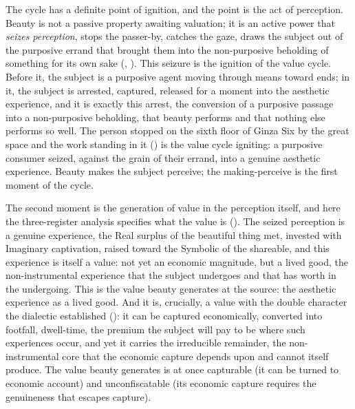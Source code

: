 The cycle has a definite point of ignition, and the point is the act of perception. Beauty is not a passive property awaiting valuation; it is an active power that \emph{seizes perception}, stops the passer-by, catches the gaze, draws the subject out of the purposive errand that brought them into the non-purposive beholding of something for its own sake (, ). This seizure is the ignition of the value cycle. Before it, the subject is a purposive agent moving through means toward ends; in it, the subject is arrested, captured, released for a moment into the aesthetic experience, and it is exactly this arrest, the conversion of a purposive passage into a non-purposive beholding, that beauty performs and that nothing else performs so well. The person stopped on the sixth floor of Ginza Six by the great space and the work standing in it () is the value cycle igniting: a purposive consumer seized, against the grain of their errand, into a genuine aesthetic experience. Beauty makes the subject perceive; the making-perceive is the first moment of the cycle.

The second moment is the generation of value in the perception itself, and here the three-register analysis specifies what the value is (). The seized perception is a genuine experience, the Real surplus of the beautiful thing met, invested with Imaginary captivation, raised toward the Symbolic of the shareable, and this experience is itself a value: not yet an economic magnitude, but a lived good, the non-instrumental experience that the subject undergoes and that has worth in the undergoing. This is the value beauty generates at the source: the aesthetic experience as a lived good. And it is, crucially, a value with the double character the dialectic established (): it can be captured economically, converted into footfall, dwell-time, the premium the subject will pay to be where such experiences occur, and yet it carries the irreducible remainder, the non-instrumental core that the economic capture depends upon and cannot itself produce. The value beauty generates is at once capturable (it can be turned to economic account) and unconfiscatable (its economic capture requires the genuineness that escapes capture).

